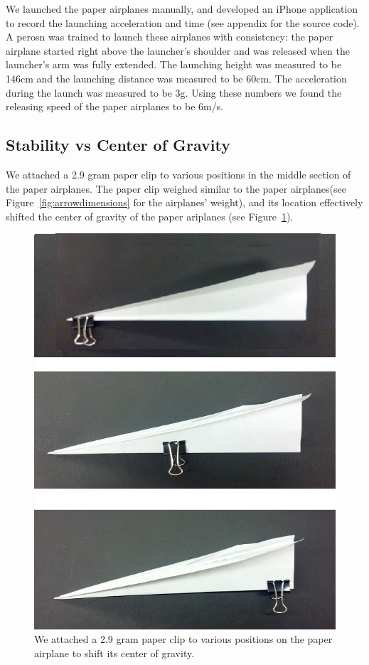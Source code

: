 We launched the paper airplanes manually, and developed an iPhone application to record the launching acceleration and time (see appendix for the source code). A perosn was trained to launch these airplanes with consistency: the paper airplane started right above the launcher's shoulder and was released when the launcher's arm was fully extended. The launching height was measured to be 146cm and the launching distance was measured to be 60cm. The acceleration during the launch was measured to be 3g. Using these numbers we found the releasing speed of the paper airplanes to be 6m/s. 

\subsection{Stability vs Center of Gravity}
We attached a 2.9 gram paper clip to various positions in the middle section of the paper airplanes. The paper clip weighed similar to the paper airplanes(see Figure~\ref{fig:arrowdimensions} for the airplanes' weight), and its location effectively shifted the center of gravity of the paper ariplanes (see Figure~\ref{fig:clip}).

\begin{figure}[hl]
	\centering
		\includegraphics[scale=0.5]{figures/clip.png}
		\caption{We attached a 2.9 gram paper clip to various positions on the paper airplane to shift its center of gravity.}
	\label{fig:clip}
\end{figure}

